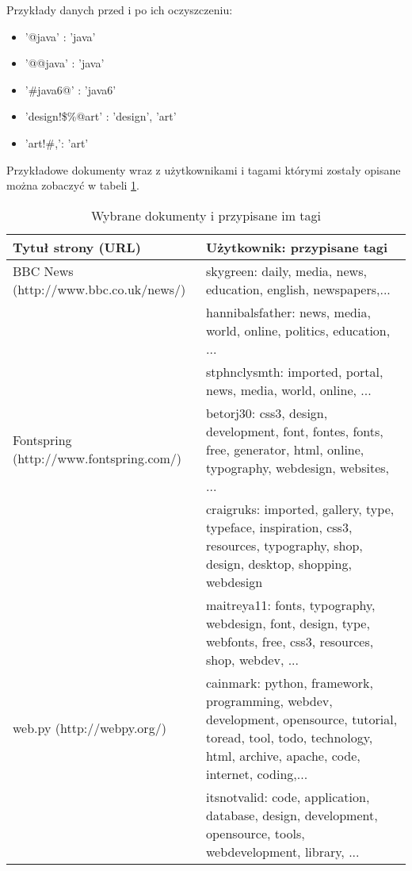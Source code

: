Przykłady danych przed i po ich oczyszczeniu:

\begin{itemize} 
    \item '@java' : 'java'
    \item '@@java' : 'java'
    \item  '\#java6@' : 'java6'
    \item  'design!\$\%@art' : 'design', 'art'
    \item  'art!\#,': 'art'
\end{itemize}

Przykładowe dokumenty wraz z użytkownikami i tagami którymi zostały opisane można zobaczyć w tabeli \ref{tab:dane_przyklad}. 


\begin{table}[htb]
\centering
    \begin{tabular}{ | p{6cm} | p{6cm} | }
\hline
 Tytuł strony (URL) & Użytkownik: przypisane tagi \\
\hline
 BBC News  \newline (http://www.bbc.co.uk/news/)  
&  skygreen: daily, media, news, education, english, newspapers,...   \\ \cline{2-2}
& hannibalsfather: news, media, world, online, politics, education, ... \\ \cline{2-2}
& stphnclysmth:  imported, portal, news, media, world, online, ... \\
\hline

 Fontspring \newline (http://www.fontspring.com/)   
& betorj30:  css3,  design,  development, font,  fontes, fonts, free, generator,  html, online,  typography,  webdesign, websites, ...  \\ \cline{2-2}
&  craigruks:  imported,  gallery, type, typeface, inspiration, css3, resources, typography,  shop, design,  desktop,  shopping,  webdesign \\ \cline{2-2}
&   maitreya11: fonts, typography, webdesign, font, design, type, webfonts, free, css3, resources, shop, webdev, ... \\
\hline

web.py \newline (http://webpy.org/)
&   cainmark:  python, framework, programming, webdev, development, opensource, tutorial, toread, tool, todo, technology, html, archive, apache, code, internet, coding,... \\ \cline{2-2}
& itsnotvalid:  code, application, database, design, development, opensource, tools, webdevelopment, library, ... \\
\hline

\end{tabular}
  \caption{Wybrane dokumenty i przypisane im tagi}
  \label{tab:dane_przyklad}
\end{table}




